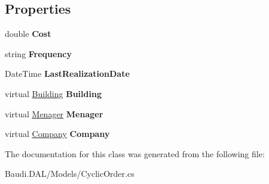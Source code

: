 \subsection*{Properties}
\begin{DoxyCompactItemize}
\item 
\hypertarget{class_baudi_1_1_d_a_l_1_1_models_1_1_cyclic_order_a5633ef9a40439eff56b37cc0d962ad02}{}double {\bfseries Cost}\label{class_baudi_1_1_d_a_l_1_1_models_1_1_cyclic_order_a5633ef9a40439eff56b37cc0d962ad02}

\item 
\hypertarget{class_baudi_1_1_d_a_l_1_1_models_1_1_cyclic_order_aa18815343f5b68a14bbb4dec85c453a6}{}string {\bfseries Frequency}\label{class_baudi_1_1_d_a_l_1_1_models_1_1_cyclic_order_aa18815343f5b68a14bbb4dec85c453a6}

\item 
\hypertarget{class_baudi_1_1_d_a_l_1_1_models_1_1_cyclic_order_a03e7e0b8903021e1a37f856ece558ee1}{}Date\+Time {\bfseries Last\+Realization\+Date}\label{class_baudi_1_1_d_a_l_1_1_models_1_1_cyclic_order_a03e7e0b8903021e1a37f856ece558ee1}

\item 
\hypertarget{class_baudi_1_1_d_a_l_1_1_models_1_1_cyclic_order_a8f6f888c7516128645293757a2ba168e}{}virtual \hyperlink{class_baudi_1_1_d_a_l_1_1_models_1_1_building}{Building} {\bfseries Building}\label{class_baudi_1_1_d_a_l_1_1_models_1_1_cyclic_order_a8f6f888c7516128645293757a2ba168e}

\item 
\hypertarget{class_baudi_1_1_d_a_l_1_1_models_1_1_cyclic_order_a72b19c138ed8849876bb5dd4365df6ab}{}virtual \hyperlink{class_baudi_1_1_d_a_l_1_1_models_1_1_menager}{Menager} {\bfseries Menager}\label{class_baudi_1_1_d_a_l_1_1_models_1_1_cyclic_order_a72b19c138ed8849876bb5dd4365df6ab}

\item 
\hypertarget{class_baudi_1_1_d_a_l_1_1_models_1_1_cyclic_order_a1423682621664dd992d3d0e69a37c818}{}virtual \hyperlink{class_baudi_1_1_d_a_l_1_1_models_1_1_company}{Company} {\bfseries Company}\label{class_baudi_1_1_d_a_l_1_1_models_1_1_cyclic_order_a1423682621664dd992d3d0e69a37c818}

\end{DoxyCompactItemize}


The documentation for this class was generated from the following file\+:\begin{DoxyCompactItemize}
\item 
Baudi.\+D\+A\+L/\+Models/Cyclic\+Order.\+cs\end{DoxyCompactItemize}
